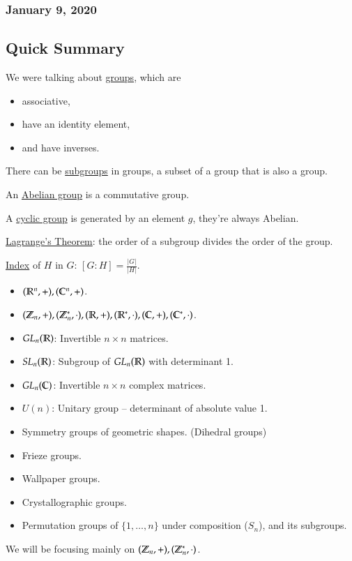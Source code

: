 \subsubsection*{January 9, 2020}
\subsection*{Quick Summary}
We were talking about \ul{groups}, which are
\begin{itemize}
	\item associative,
	\item have an identity element,
	\item and have inverses.
\end{itemize}

There can be \ul{subgroups} in groups, a subset of a group that is also a group. 

An \ul{Abelian group} is a commutative group. 

A \ul{cyclic group} is generated by an element $g$, they're always Abelian. 

\ul{Lagrange's Theorem}: the order of a subgroup divides the order of the group. 

\ul{Index} of $H$ in $G$: $[G:H]=\frac{|G|}{|H|}$. 

\example
\begin{itemize}
\item $(\mathbb{R}^n, +), (\mathbb{C}^n, +)$. 
\item $(\mathbb{Z}_n, +), (\mathbb{Z}_n^*, \cdot), (\mathbb{R}, +), (\mathbb{R}^*, \cdot), (\mathbb{C}, +), (\mathbb{C}^*, \cdot)$. 
\item $GL_n(\mathbb{R})$: Invertible $n\times n$ matrices. 
\item $SL_n(\mathbb{R})$: Subgroup of $GL_n(\mathbb{R})$ with determinant 1. 
\item $GL_n(\mathbb{C})$: Invertible $n\times n$ complex matrices. 
\item $U(n)$: Unitary group – determinant of absolute value 1. 
\item Symmetry groups of geometric shapes. (Dihedral groups)
\item Frieze groups. 
\item Wallpaper groups. 
\item Crystallographic groups. 
\item Permutation groups of $\{1, \dots, n\}$ under composition ($S_n$), and its subgroups. 
\end{itemize}

We will be focusing mainly on $(\mathbb{Z}_n, +), (\mathbb{Z}_n^*, \cdot)$. 

